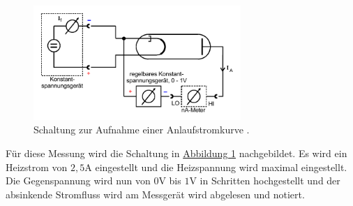\begin{figure}
    \centering
    \includegraphics[width=0.7\textwidth]{pictures/Aufbau2.pdf}
    \caption{Schaltung zur Aufnahme einer Anlaufstromkurve \cite{v504}.}
    \label{fig:Aufbau2}
\end{figure}

Für diese Messung wird die Schaltung in \hyperref[fig:Aufbau2]{Abbildung \ref{fig:Aufbau2}} nachgebildet.
Es wird ein Heizstrom von $2,5 \unit\ampere$ eingestellt und die Heizspannung wird maximal eingestellt.
Die Gegenspannung wird nun von $0 \unit\volt$ bis $ 1 \unit\volt$ in Schritten hochgestellt
und der absinkende Stromfluss wird am Messgerät wird abgelesen und notiert.